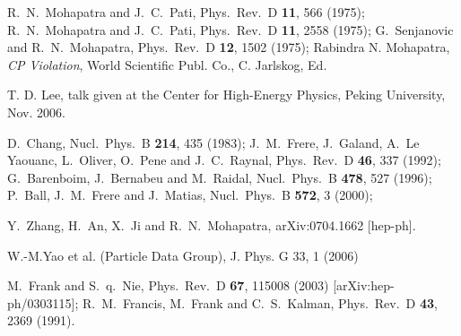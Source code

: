 \documentclass[prd,aps,preprint,tightenlines,superscriptaddress]{revtex4}
\begin{document}
\begin{thebibliography}
\frenchspacing
{}
R.~N.~Mohapatra and J.~C.~Pati,
  Phys.\ Rev.\  D {\bf 11}, 566 (1975);
R.~N.~Mohapatra and J.~C.~Pati,
  Phys.\ Rev.\  D {\bf 11}, 2558 (1975);
G.~Senjanovic and R.~N.~Mohapatra,
  Phys.\ Rev.\  D {\bf 12}, 1502 (1975);
Rabindra N. Mohapatra, {\it CP Violation}, World Scientific Publ.
Co., C. Jarlskog, Ed.

T. D. Lee, talk given at the Center for High-Energy Physics, Peking
University, Nov. 2006.

D.~Chang,
  Nucl.\ Phys.\  B {\bf 214}, 435 (1983);
J.~M.~Frere, J.~Galand, A.~Le Yaouanc, L.~Oliver, O.~Pene and
J.~C.~Raynal,
  Phys.\ Rev.\  D {\bf 46}, 337 (1992);
G.~Barenboim, J.~Bernabeu and M.~Raidal,
  Nucl.\ Phys.\  B {\bf 478}, 527 (1996);
P.~Ball, J.~M.~Frere and J.~Matias,
  Nucl.\ Phys.\  B {\bf 572}, 3 (2000);

  Y.~Zhang, H.~An, X.~Ji and R.~N.~Mohapatra,
  arXiv:0704.1662 [hep-ph].

W.-M.Yao et al. (Particle Data Group), J. Phys. G 33, 1 (2006)

  M.~Frank and S.~q.~Nie,
  Phys.\ Rev.\  D {\bf 67}, 115008 (2003)
  [arXiv:hep-ph/0303115];
  R.~M.~Francis, M.~Frank and C.~S.~Kalman,
  Phys.\ Rev.\  D {\bf 43}, 2369 (1991).



\end{thebibliography}
\end{document}
